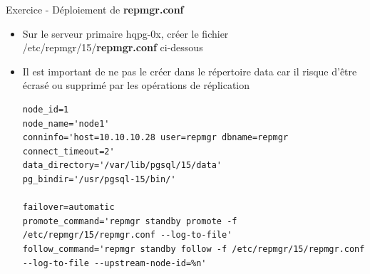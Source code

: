 
\begin{frame}[fragile]{Exercice - Déploiement de \textbf{repmgr.conf}}

   \begin{itemize}
      \item Sur le serveur primaire hqpg-0x, créer le fichier /etc/repmgr/15/\textbf{repmgr.conf} ci-dessous
      \item Il est important de ne pas le créer dans le répertoire data car il risque d'être écrasé ou supprimé par les opérations de réplication
\begin{Verbatim}[fontsize=\tiny]
node_id=1
node_name='node1'
conninfo='host=10.10.10.28 user=repmgr dbname=repmgr connect_timeout=2'
data_directory='/var/lib/pgsql/15/data'
pg_bindir='/usr/pgsql-15/bin/'

failover=automatic
promote_command='repmgr standby promote -f /etc/repmgr/15/repmgr.conf --log-to-file'
follow_command='repmgr standby follow -f /etc/repmgr/15/repmgr.conf --log-to-file --upstream-node-id=%n'
\end{Verbatim}
   \end{itemize}

\begin{toile}
\end{toile}

\end{frame}


